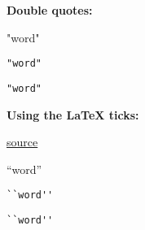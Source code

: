 \textbf{Double quotes:}

"word"

\verb|"word"|

\begin{lstlisting}
"word"
\end{lstlisting}

\textbf{Using the LaTeX ticks:}

\href{http://www.maths.tcd.ie/~dwilkins/LaTeXPrimer/QuotDash.html}{source}

``word''

\verb|``word''|

\begin{lstlisting}
``word''
\end{lstlisting}
